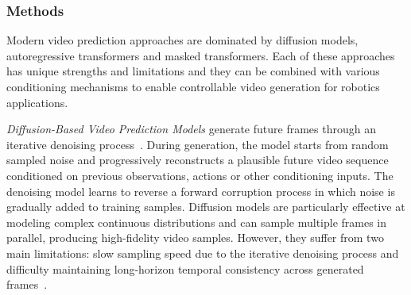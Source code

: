 \subsubsection{Methods}
Modern video prediction approaches are dominated by diffusion models, autoregressive transformers and masked transformers. Each of these approaches has unique strengths and limitations and they can be combined with various conditioning mechanisms to enable controllable video generation for robotics applications.


\textit{Diffusion-Based Video Prediction Models} 
generate future frames through an iterative denoising process~\cite{Ho2022VideoDM, Ho2022ImagenVH}. During generation, the model starts from random sampled noise and progressively reconstructs a plausible future video sequence conditioned on previous observations, actions or other conditioning inputs. The denoising model learns to reverse a forward corruption process in which noise is gradually added to training samples.
Diffusion models are particularly effective at modeling complex continuous distributions and can sample multiple frames in parallel, producing high-fidelity video samples. However, they suffer from two main limitations: slow sampling speed due to the iterative denoising process and difficulty maintaining long-horizon temporal consistency across generated frames~\cite{Yang2024VideoAT}.

